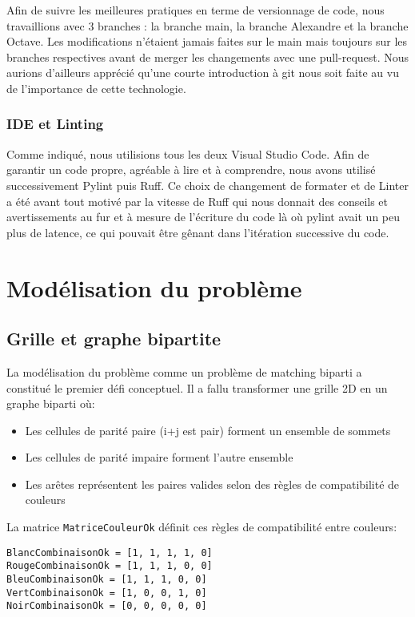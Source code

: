 \documentclass[11pt, a4paper]{article}
\begin{document}
Afin de suivre les meilleures pratiques en terme de versionnage de code, nous travaillions avec 3 branches : la branche main, la branche Alexandre et la branche Octave. Les modifications n'étaient jamais faites sur le main mais toujours sur les branches respectives avant de merger les changements avec une pull-request.
Nous aurions d'ailleurs apprécié qu'une courte introduction à git nous soit faite au vu de l'importance de cette technologie.

\subsubsection{IDE et Linting}

Comme indiqué, nous utilisions tous les deux Visual Studio Code.
Afin de garantir un code propre, agréable à lire et à comprendre, nous avons utilisé successivement Pylint puis Ruff. Ce choix de changement de formater et de Linter a été avant tout motivé par la vitesse de Ruff qui nous donnait des conseils et avertissements au fur et à mesure de l'écriture du code là où pylint avait un peu plus de latence, ce qui pouvait être gênant dans l'itération successive du code.

\section{Modélisation du problème}
\label{sec:modelisation}

\subsection{Grille et graphe bipartite}

La modélisation du problème comme un problème de matching biparti a constitué le premier défi conceptuel. Il a fallu transformer une grille 2D en un graphe biparti où:
\begin{itemize}
    \item Les cellules de parité paire (i+j est pair) forment un ensemble de sommets
    \item Les cellules de parité impaire forment l'autre ensemble
    \item Les arêtes représentent les paires valides selon des règles de compatibilité de couleurs
\end{itemize}

La matrice \texttt{MatriceCouleurOk} définit ces règles de compatibilité entre couleurs:
\begin{lstlisting}[caption=Matrice de compatibilite des couleurs]
BlancCombinaisonOk = [1, 1, 1, 1, 0]
RougeCombinaisonOk = [1, 1, 1, 0, 0]
BleuCombinaisonOk = [1, 1, 1, 0, 0]
VertCombinaisonOk = [1, 0, 0, 1, 0]
NoirCombinaisonOk = [0, 0, 0, 0, 0]
\end{lstlisting}
\end{document}
